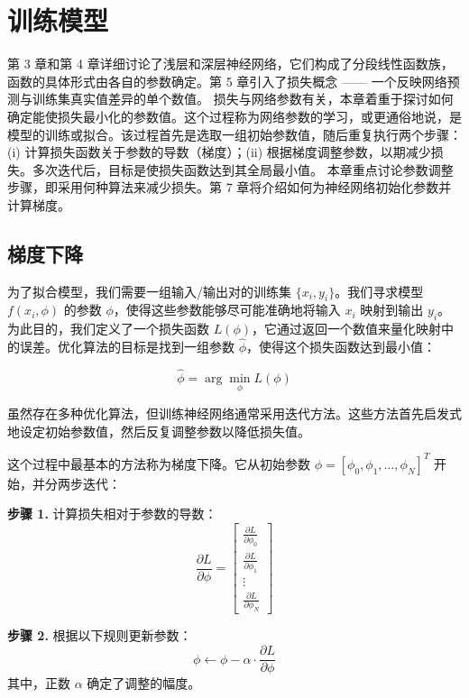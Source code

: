 \chapter{训练模型}
第 3 章和第 4 章详细讨论了浅层和深层神经网络，它们构成了分段线性函数族，函数的具体形式由各自的参数确定。第 5 章引入了损失概念 —— 一个反映网络预测与训练集真实值差异的单个数值。
损失与网络参数有关，本章着重于探讨如何确定能使损失最小化的参数值。这个过程称为网络参数的学习，或更通俗地说，是模型的训练或拟合。该过程首先是选取一组初始参数值，随后重复执行两个步骤：(i) 计算损失函数关于参数的导数（梯度）；(ii) 根据梯度调整参数，以期减少损失。多次迭代后，目标是使损失函数达到其全局最小值。
本章重点讨论参数调整步骤，即采用何种算法来减少损失。第 7 章将介绍如何为神经网络初始化参数并计算梯度。
\section{梯度下降}
为了拟合模型，我们需要一组输入/输出对的训练集 \(\{x_i, y_i\}\)。我们寻求模型 \(f(x_i, \phi)\) 的参数 \(\phi\)，使得这些参数能够尽可能准确地将输入 \(x_i\) 映射到输出 \(y_i\)。为此目的，我们定义了一个损失函数 \(L(\phi)\)，它通过返回一个数值来量化映射中的误差。优化算法的目标是找到一组参数 \(\hat{\phi}\)，使得这个损失函数达到最小值：

\begin{equation}
\hat{\phi} = \arg\min_{\phi} L(\phi) 
\end{equation}


虽然存在多种优化算法，但训练神经网络通常采用迭代方法。这些方法首先启发式地设定初始参数值，然后反复调整参数以降低损失值。

这个过程中最基本的方法称为梯度下降。它从初始参数 \(\phi = [\phi_0, \phi_1, \ldots, \phi_N]^T\) 开始，并分两步迭代：

\textbf{步骤 1.} 计算损失相对于参数的导数：
\begin{equation}
\frac{\partial L}{\partial \phi} =
\begin{bmatrix}
\frac{\partial L}{\partial \phi_0}  \\
\frac{\partial L}{\partial \phi_1}  \\
\vdots  \\
\frac{\partial L}{\partial \phi_N} 
\end{bmatrix} 
\end{equation}

\textbf{步骤 2.} 根据以下规则更新参数：
\begin{equation}
\phi \leftarrow \phi - \alpha \cdot \frac{\partial L}{\partial \phi} 
\end{equation}
其中，正数 \(\alpha\) 确定了调整的幅度。

